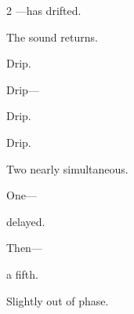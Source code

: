 \begin{paracol}{2}
---has drifted.

\medskip

\switchcolumn*


\medskip

\switchcolumn

The sound returns.

\medskip

Drip.

\medskip

\switchcolumn*

Drip---

Drip.

\medskip

\switchcolumn

Drip.

\medskip

Two nearly simultaneous.

\medskip

One---

\medskip

delayed.

\medskip

\switchcolumn*

Then---

\medskip

a fifth.

\medskip

\switchcolumn

\medskip

Slightly out of phase.

\medskip

\end{paracol}

\pagestyle{incoherence}
